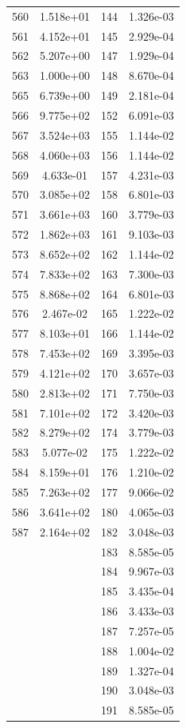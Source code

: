 \documentclass[12pt]{article}
\begin{document}
\begin{longtable}{@{}cccc@{}}
560 & 1.518e+01 & 144 & 1.326e-03 \\
561 & 4.152e+01 & 145 & 2.929e-04 \\
562 & 5.207e+00 & 147 & 1.929e-04 \\
563 & 1.000e+00 & 148 & 8.670e-04 \\
565 & 6.739e+00 & 149 & 2.181e-04 \\
566 & 9.775e+02 & 152 & 6.091e-03 \\
567 & 3.524e+03 & 155 & 1.144e-02 \\
568 & 4.060e+03 & 156 & 1.144e-02 \\
569 & 4.633e-01 & 157 & 4.231e-03 \\
570 & 3.085e+02 & 158 & 6.801e-03 \\
571 & 3.661e+03 & 160 & 3.779e-03 \\
572 & 1.862e+03 & 161 & 9.103e-03 \\
573 & 8.652e+02 & 162 & 1.144e-02 \\
574 & 7.833e+02 & 163 & 7.300e-03 \\
575 & 8.868e+02 & 164 & 6.801e-03 \\
576 & 2.467e-02 & 165 & 1.222e-02 \\
577 & 8.103e+01 & 166 & 1.144e-02 \\
578 & 7.453e+02 & 169 & 3.395e-03 \\
579 & 4.121e+02 & 170 & 3.657e-03 \\
580 & 2.813e+02 & 171 & 7.750e-03 \\
581 & 7.101e+02 & 172 & 3.420e-03 \\
582 & 8.279e+02 & 174 & 3.779e-03 \\
583 & 5.077e-02 & 175 & 1.222e-02 \\
584 & 8.159e+01 & 176 & 1.210e-02 \\
585 & 7.263e+02 & 177 & 9.066e-02 \\
586 & 3.641e+02 & 180 & 4.065e-03 \\
587 & 2.164e+02 & 182 & 3.048e-03 \\
 &  & 183 & 8.585e-05 \\
 &  & 184 & 9.967e-03 \\
 &  & 185 & 3.435e-04 \\
 &  & 186 & 3.433e-03 \\
 &  & 187 & 7.257e-05 \\
 &  & 188 & 1.004e-02 \\
 &  & 189 & 1.327e-04 \\
 &  & 190 & 3.048e-03 \\
 &  & 191 & 8.585e-05 \\

\end{longtable}
\end{document}

